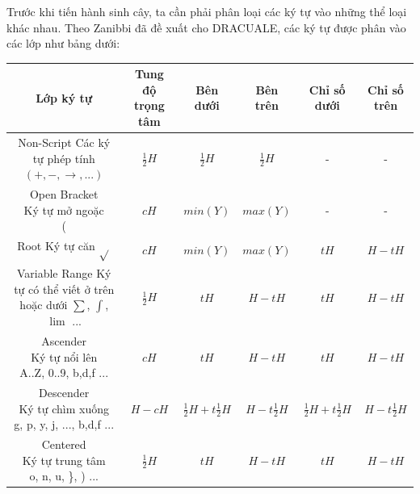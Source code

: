 \documentclass[a4paper,12pt]{article}
\begin{document}
	Trước khi tiến hành sinh cây, ta cần phải phân loại các ký tự vào những thể loại khác nhau. Theo Zanibbi đã đề xuất cho DRACUALE\cite{zanibbi}, các ký tự được phân vào các lớp như bảng dưới:
	
	\begin{center}
		\begin{tabular}{||c | c | c c c c ||} 
			\hline
			Lớp ký tự & Tung độ trọng tâm & Bên dưới & Bên trên & Chỉ số dưới & Chỉ số trên \\ [0.5ex] 
			\hline\hline
			\makecell{Non-Script \\ Các ký tự phép tính\\ $(+, -, \rightarrow, ... )$} & $\frac{1}{2}H$ & $\frac{1}{2}H$ & $\frac{1}{2}H$ & - & - \\ 
			\hline
			\makecell{Open Bracket \\ Ký tự mở ngoặc \\ ( } & $cH$ & $min(Y)$ & $max(Y)$ & - & - \\
			\hline
			\makecell{Root \\ Ký tự căn \\ $\sqrt{}$ } & $cH$ & $min(Y)$ & $max(Y)$ & $tH$ & $H - tH$ \\
			\hline
			\makecell{Variable Range \\ Ký tự có thể viết \\ ở trên hoặc dưới \\ $\sum$, $\int$, $\lim$ ... } & $\frac{1}{2}H$ & $tH$ & $H-tH$ & $tH$ & $H- tH$ \\
			\hline
			\makecell{Ascender \\ Ký tự nổi lên \\ A..Z, 0..9, b,d,f ... } & $cH$ &  $tH$ & $H-tH$ & $tH$ & $H- tH$ \\
			\hline
			\makecell{Descender \\ Ký tự chìm xuống \\ g, p, y, j, ..., b,d,f ... } & $H - cH$ &  $\frac{1}{2}H + t\frac{1}{2}H$ & $H-t\frac{1}{2}H$ & $\frac{1}{2}H + t\frac{1}{2}H$ & $H-t\frac{1}{2}H$ \\ 
			\hline
			\makecell{Centered \\ Ký tự trung tâm \\ o, n, u, \}, ) ... } & $\frac{1}{2}H$ &  $tH$ & $H-tH$ & $tH$ & $H- tH$
			\\ \hline
			
			
		\end{tabular}
		
	\end{center}
	
\end{document}
